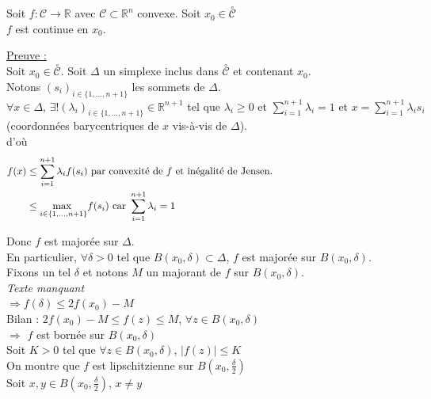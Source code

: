 \documentclass[12pt,a4paper]{article}
\newcommand{\propriete}[2]{%
    \begin{tcolorbox}[colback=white,colframe=green!25!white,title=\textbf{Propriété #1}, coltitle=black]
        #2
    \end{tcolorbox}
}
\begin{document}
\propriete{}{
    Soit $f : \mathcal{C} \rightarrow \mathbb{R}$ avec $\mathcal{C} \subset \mathbb{R}^n$ convexe.
    Soit $x_0 \in \overset{\circ}{\mathcal{C}}$\\
    $f$ est continue en $x_0$.
}


\noindent\underline{Preuve :}\\
Soit $x_0 \in \overset{\circ}{\mathcal{C}}$.
Soit $\Delta$ un simplexe inclus dans $\overset{\circ}{\mathcal{C}}$ et contenant $x_0$.\\
Notons $(s_i)_{i \in \{1, \dots, n + 1\}}$ les sommets de $\Delta$.\\
$\forall x \in \Delta$, $\exists! (\lambda_i)_{i \in \{1, \dots, n + 1\}} \in \mathbb{R}^{n + 1}$ tel que $\lambda_i \geq 0$ et $\sum_{i=1}^{n + 1} \lambda_i = 1$ et $x = \sum_{i=1}^{n + 1} \lambda_i s_i$\\
(coordonnées barycentriques de $x$ vis-à-vis de $\Delta$).\\

\noindent d'où
\begin{align*}
    f(x) &\leq \sum_{i=1}^{n + 1} \lambda_i f(s_i) \text{ par convexité de } f \text{ et inégalité de Jensen.}\hspace{14.5cm}\\
    & \leq \underset{i \in \{1, \dots, n + 1\}}{\text{max }} f(s_i) \text{ car } \sum_{i=1}^{n + 1} \lambda_i = 1
\end{align*}

Donc $f$ est majorée sur $\Delta$.\\
En particulier, $\forall \delta > 0$ tel que $B(x_0, \delta) \subset \Delta$, $f$ est majorée sur $B(x_0, \delta)$.\\
Fixons un tel $\delta$ et notons $M$ un majorant de $f$ sur $B(x_0, \delta)$.\\

\textit{Texte manquant}\\


$\Rightarrow f(\delta) \leq 2f(x_0) - M$\\

Bilan : $2f(x_0) - M \leq f(z) \leq M$, $\forall z \in B(x_0, \delta)$\\
$\Rightarrow$ $f$ est bornée sur $B(x_0, \delta)$\\

Soit $K > 0$ tel que $\forall z \in B(x_0, \delta)$, $|f(z)| \leq K$\\

On montre que $f$ est lipschitzienne sur $B(x_0, \frac{\delta}{2})$\\
Soit $x, y \in B(x_0, \frac{\delta}{2})$, $x \neq y$\\
\end{document}
